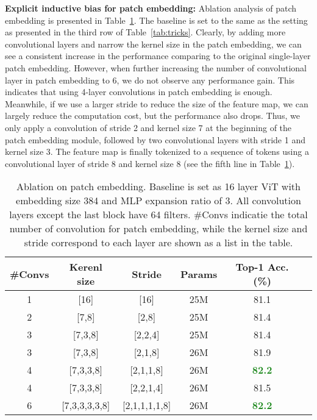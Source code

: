 \documentclass[10pt,twocolumn,letterpaper]{article}
\newcommand{\highlight}[1]{\textcolor{ForestGreen}{\textbf{#1}}}
\newcommand{\myPara}[1]{\vspace{.05in}\noindent\textbf{#1:}}
\begin{document}
\myPara{Explicit inductive bias for patch embedding}
Ablation analysis of patch embedding is presented in Table~\ref{tab:abl_conv}. 
The baseline is set to the same as the setting as presented in the third row of Table~\ref{tab:tricks}.
Clearly, by adding more convolutional layers and narrow the kernel size in the patch embedding,
we can see a consistent increase in the performance comparing to the original single-layer patch embedding.
However, when further increasing the number of convolutional layer in patch embedding to 6, 
we do not observe any performance gain.
This indicates that using 4-layer convolutions in patch embedding is enough.
Meanwhile, if we use a larger stride to reduce the size of the feature map,
we can largely reduce the computation cost, but the performance also drops. 
Thus, we only apply a convolution of stride 2 and kernel size 7 at the beginning of 
the patch embedding module, followed by two convolutional layers with stride 1 and kernel size 3.
The feature map is finally tokenized to a sequence of tokens using a convolutional layer of stride 8 
and kernel size 8 (see the fifth line in Table~\ref{tab:abl_conv}).

\begin{table}[t]
  \centering
  \small
  \setlength\tabcolsep{1.1mm}
  \renewcommand\arraystretch{1.1}
  \caption{Ablation on patch embedding. Baseline is set as 16 layer ViT with embedding size 384 and MLP expansion ratio of 3.
  All convolution layers except the last block have 64 filters. \#Convs indicatie the total number of convolution for patch embedding, while the kernel size and stride correspond to each layer are shown as a list in the table.}
  
  \label{tab:abl_conv}
  \begin{tabular}{cccccc} \toprule[0.5pt]
    \#Convs & Kerenl size & Stride & Params & Top-1 Acc. (\%) \\ \midrule[0.5pt] \midrule[0.5pt]
    1 & [16] & [16] &25M &  81.1\\
    2 & [7,8] & [2,8] &25M &  81.4\\ 
    3 & [7,3,8] & [2,2,4] &25M &  81.4\\
    3 & [7,3,8] & [2,1,8] &26M & 81.9\\
    4 & [7,3,3,8] & [2,1,1,8] &26M & \highlight{82.2}\\4 & [7,3,3,8] & [2,2,1,4] &26M &  81.5\\
    6 & [7,3,3,3,3,8] & [2,1,1,1,1,8] &26M & \highlight{82.2}\\

    \bottomrule[0.5pt]
  \end{tabular}
\end{table}
\end{document}
